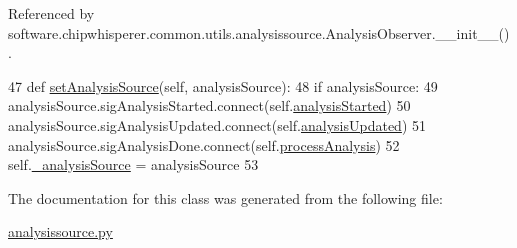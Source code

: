 Referenced by software.\+chipwhisperer.\+common.\+utils.\+analysissource.\+Analysis\+Observer.\+\_\+\+\_\+init\+\_\+\+\_\+().


\begin{DoxyCode}
47     \textcolor{keyword}{def }\hyperlink{classsoftware_1_1chipwhisperer_1_1common_1_1utils_1_1analysissource_1_1AnalysisObserver_a3425f89ca10d5fec49bba248c88e9c1d}{setAnalysisSource}(self, analysisSource):
48         \textcolor{keywordflow}{if} analysisSource:
49             analysisSource.sigAnalysisStarted.connect(self.\hyperlink{classsoftware_1_1chipwhisperer_1_1common_1_1utils_1_1analysissource_1_1AnalysisObserver_a7565146f84c8b4c93724fd070ce2dbc0}{analysisStarted})
50             analysisSource.sigAnalysisUpdated.connect(self.\hyperlink{classsoftware_1_1chipwhisperer_1_1common_1_1utils_1_1analysissource_1_1AnalysisObserver_a61b42322a68fb1b3f17abfd114947e17}{analysisUpdated})
51             analysisSource.sigAnalysisDone.connect(self.\hyperlink{classsoftware_1_1chipwhisperer_1_1common_1_1utils_1_1analysissource_1_1AnalysisObserver_afb954c0f5a5a2031ede490e99990a4cf}{processAnalysis})
52         self.\hyperlink{classsoftware_1_1chipwhisperer_1_1common_1_1utils_1_1analysissource_1_1AnalysisObserver_a0d1eb590cb92205963833290199b05a4}{\_analysisSource} = analysisSource
53 
\end{DoxyCode}


The documentation for this class was generated from the following file\+:\begin{DoxyCompactItemize}
\item 
\hyperlink{analysissource_8py}{analysissource.\+py}\end{DoxyCompactItemize}
